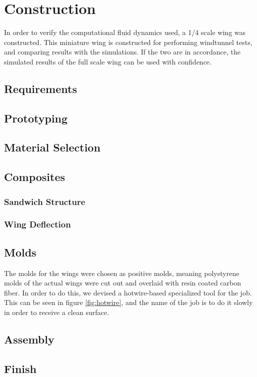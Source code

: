 \chapter{Construction}

In order to verify the computational fluid dynamics used, a 1/4 scale wing was constructed. This miniature wing is constructed for performing windtunnel tests, and comparing results with the simulations. If the two are in accordance, the simulated results of the full scale wing can be used with confidence.

\section{Requirements}




\section{Prototyping}

\section{Material Selection}

\section{Composites}
  \subsection{Sandwich Structure}
  \subsection{Wing Deflection}


\section{Molds}

The molds for the wings were chosen as positive molds, meaning polystyrene molds of the actual wings were cut out and overlaid with resin coated carbon fiber. In order to do this, we devised a hotwire-based specialized tool for the job. This can be seen in figure \ref{fig:hotwire}, and the name of the job is to do it slowly in order to receive a clean surface.



\section{Assembly}

\section{Finish}
